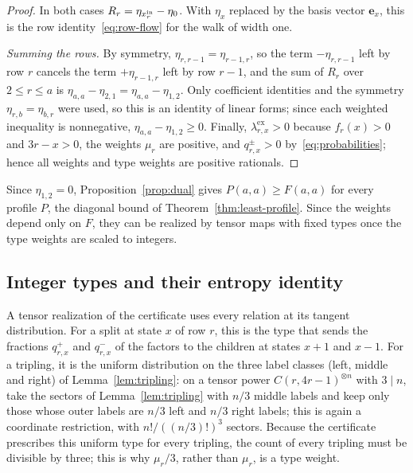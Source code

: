 \begin{proof}
In both cases \(R_r=\eta_{x^{\mathrm{in}}_r}-\eta_0\). With \(\eta_x\) replaced by
the basis vector \(\mathbf e_x\), this is the row
identity~\eqref{eq:row-flow} for the walk of width one.

\emph{Summing the rows.} By symmetry, \(\eta_{r,r-1}=\eta_{r-1,r}\), so
the term \(-\eta_{r,r-1}\) left by row \(r\) cancels the term
\(+\eta_{r-1,r}\) left by row \(r-1\), and the sum of \(R_r\) over
\(2\le r\le a\) is \(\eta_{a,a}-\eta_{2,1}=\eta_{a,a}-\eta_{1,2}\). Only
coefficient identities and the symmetry \(\eta_{r,b}=\eta_{b,r}\) were
used, so this is an identity of linear forms; since each weighted
inequality is nonnegative, \(\eta_{a,a}-\eta_{1,2}\ge0\). Finally,
\(\lambda^{\mathrm{ex}}_{r,x}>0\) because \(f_r(x)>0\) and \(3r-x>0\), the weights \(\mu_r\) are positive,
and \(q^\pm_{r,x}>0\) by~\eqref{eq:probabilities}; hence all weights and
type weights are positive rationals.
\end{proof}

Since \(\eta_{1,2}=0\), Proposition~\ref{prop:dual} gives
\(P(a,a)\ge F(a,a)\) for every profile \(P\), the diagonal bound of
Theorem~\ref{thm:least-profile}. Since the weights depend only on \(F\),
they can be realized by tensor maps with fixed types once the type
weights are scaled to integers.

\subsection{Integer types and their entropy identity}
\label{subsec:types}

A tensor realization of the certificate uses every relation at its
tangent distribution. For a split at state \(x\) of row \(r\), this is
the type that sends the fractions \(q^+_{r,x}\) and \(q^-_{r,x}\) of the
factors to the children at states \(x+1\) and \(x-1\). For a tripling,
it is the uniform distribution on the three label classes (left, middle
and right) of Lemma~\ref{lem:tripling}: on a tensor power
\(C(r,4r-1)^{\otimes n}\) with \(3\mid n\), take the sectors of
Lemma~\ref{lem:tripling} with \(n/3\) middle labels and keep only those
whose outer labels are \(n/3\) left and \(n/3\) right labels; this is
again a coordinate restriction, with \(n!/((n/3)!)^3\) sectors. Because
the certificate prescribes this uniform type for every tripling, the
count of every tripling must be divisible by three; this is why
\(\mu_r/3\), rather than \(\mu_r\), is a type weight.

